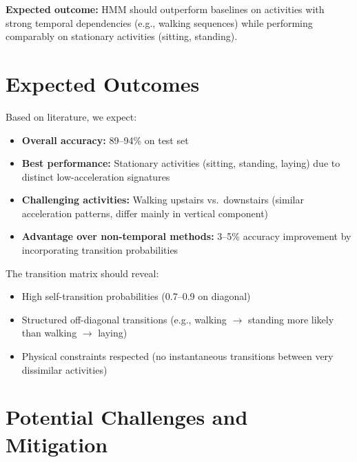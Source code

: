 \documentclass[11pt,a4paper]{article}
\begin{document}
\textbf{Expected outcome:} HMM should outperform baselines on activities with strong temporal dependencies (e.g., walking sequences) while performing comparably on stationary activities (sitting, standing).

\section{Expected Outcomes}

Based on literature, we expect:
\begin{itemize}[leftmargin=*]
    \item \textbf{Overall accuracy:} 89--94\% on test set
    \item \textbf{Best performance:} Stationary activities (sitting, standing, laying) due to distinct low-acceleration signatures
    \item \textbf{Challenging activities:} Walking upstairs vs.\ downstairs (similar acceleration patterns, differ mainly in vertical component)
    \item \textbf{Advantage over non-temporal methods:} 3--5\% accuracy improvement by incorporating transition probabilities
\end{itemize}

The transition matrix should reveal:
\begin{itemize}[leftmargin=*]
    \item High self-transition probabilities (0.7--0.9 on diagonal)
    \item Structured off-diagonal transitions (e.g., walking $\rightarrow$ standing more likely than walking $\rightarrow$ laying)
    \item Physical constraints respected (no instantaneous transitions between very dissimilar activities)
\end{itemize}

\section{Potential Challenges and Mitigation}
\end{document}
